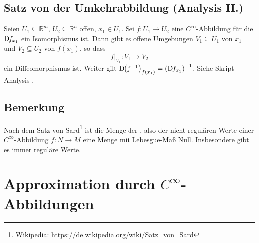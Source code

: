\subsection{Satz von der Umkehrabbildung (Analysis II.)} %
\label{sub:1610}
Seien $U_1 \subseteq \mathds{R}^m$, $U_2 \subseteq \mathds{R}^n$ offen, $x_1 \in U_1$. Sei $f : U_1 \to U_2$ eine $C^\infty$-Abbildung für die $\mathrm{D}\mkern-1.5mu f_{x_1}$ ein 
Isomorphismus ist. Dann gibt es offene Umgebungen $V_1 \subseteq U_1$ von $x_1$ und $V_2 \subseteq U_2$ von $f(x_1)$, so dass
\[
	f \big|_{V_1} : V_1 \to V_2
\]
ein Diffeomorphismus ist. {\color{light_gray} Weiter gilt
\(
	\D \enbrace*{f ^{-1}}_{f(x_1)} = \enbrace*{\D f_{x_1}}^{-1}.
\)}
Siehe Skript Analysis . \bewende

\subsection[Bemerkung: Aussage des Satzes von Sard]{Bemerkung} %
\label{sub:1611}
Nach dem Satz von Sard\footnote{Wikipedia: \url{https://de.wikipedia.org/wiki/Satz_von_Sard}} ist die Menge der , also der 
nicht regulären Werte einer $C^\infty$-Abbildung $f : N \to M$ eine Menge mit Lebesgue-Maß Null. Insbesondere gibt es immer reguläre Werte.
\newpage

\section{Approximation durch $C^\infty$-Abbildungen} %
\label{sec:17}


